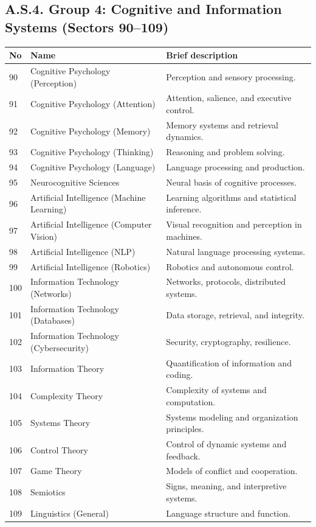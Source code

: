 \documentclass[13pt,a4paper]{article}
\begin{document}
	\subsection*{A.S.4. Group 4: Cognitive and Information Systems (Sectors 90--109)}
	
	\begin{longtable}{|p{0.9cm}|p{6.0cm}|p{8.6cm}|}
		\hline
		\textbf{No} & \textbf{Name} & \textbf{Brief description} \\
		\hline
		\endhead
		90 & Cognitive Psychology (Perception) & Perception and sensory processing. \\
		\hline
		91 & Cognitive Psychology (Attention) & Attention, salience, and executive control. \\
		\hline
		92 & Cognitive Psychology (Memory) & Memory systems and retrieval dynamics. \\
		\hline
		93 & Cognitive Psychology (Thinking) & Reasoning and problem solving. \\
		\hline
		94 & Cognitive Psychology (Language) & Language processing and production. \\
		\hline
		95 & Neurocognitive Sciences & Neural basis of cognitive processes. \\
		\hline
		96 & Artificial Intelligence (Machine Learning) & Learning algorithms and statistical inference. \\
		\hline
		97 & Artificial Intelligence (Computer Vision) & Visual recognition and perception in machines. \\
		\hline
		98 & Artificial Intelligence (NLP) & Natural language processing systems. \\
		\hline
		99 & Artificial Intelligence (Robotics) & Robotics and autonomous control. \\
		\hline
		100 & Information Technology (Networks) & Networks, protocols, distributed systems. \\
		\hline
		101 & Information Technology (Databases) & Data storage, retrieval, and integrity. \\
		\hline
		102 & Information Technology (Cybersecurity) & Security, cryptography, resilience. \\
		\hline
		103 & Information Theory & Quantification of information and coding. \\
		\hline
		104 & Complexity Theory & Complexity of systems and computation. \\
		\hline
		105 & Systems Theory & Systems modeling and organization principles. \\
		\hline
		106 & Control Theory & Control of dynamic systems and feedback. \\
		\hline
		107 & Game Theory & Models of conflict and cooperation. \\
		\hline
		108 & Semiotics & Signs, meaning, and interpretive systems. \\
		\hline
		109 & Linguistics (General) & Language structure and function. \\
		\hline
	\end{longtable}
	
\end{document}
